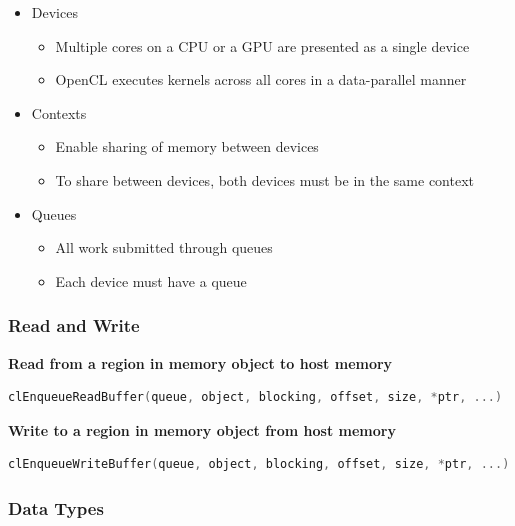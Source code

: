 \clearpage
\begin{itemize}
\tightlist
\item
  Devices

  \begin{itemize}
  \tightlist
  \item
    Multiple cores on a CPU or a GPU are presented as a single device
  \item
    OpenCL executes kernels across all cores in a data-parallel manner
  \end{itemize}
\item
  Contexts

  \begin{itemize}
  \tightlist
  \item
    Enable sharing of memory between devices
  \item
    To share between devices, both devices must be in the same context
  \end{itemize}
\item
  Queues

  \begin{itemize}
  \tightlist
  \item
    All work submitted through queues
  \item
    Each device must have a queue
  \end{itemize}
\end{itemize}

\hypertarget{read-and-write}{%
\subsubsection{Read and Write}\label{read-and-write}}

\textbf{Read from a region in memory object to host
memory}

\begin{lstlisting}[language=C++]
clEnqueueReadBuffer(queue, object, blocking, offset, size, *ptr, ...)
\end{lstlisting}

\textbf{Write to a region in memory object from host memory}

\begin{lstlisting}[language=C++]
clEnqueueWriteBuffer(queue, object, blocking, offset, size, *ptr, ...)
\end{lstlisting}

\hypertarget{data-types}{%
\subsubsection{Data Types}\label{data-types}}

